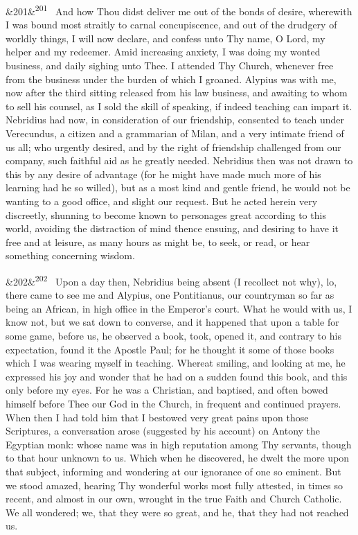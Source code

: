 \documentclass[12pt]{article}
\newcommand{\para}[1][]{\par\noindent\ifx&#1&\else\textsuperscript{\footnotesize #1}~\fi}
\begin{document}
\para[201] And how Thou didst deliver me out of the bonds of desire, wherewith I was bound most straitly to carnal concupiscence, and out of the drudgery of worldly things, I will now declare, and confess unto Thy name, O Lord, my helper and my redeemer. Amid increasing anxiety, I was doing my wonted business, and daily sighing unto Thee. I attended Thy Church, whenever free from the business under the burden of which I groaned. Alypius was with me, now after the third sitting released from his law business, and awaiting to whom to sell his counsel, as I sold the skill of speaking, if indeed teaching can impart it. Nebridius had now, in consideration of our friendship, consented to teach under Verecundus, a citizen and a grammarian of Milan, and a very intimate friend of us all; who urgently desired, and by the right of friendship challenged from our company, such faithful aid as he greatly needed. Nebridius then was not drawn to this by any desire of advantage (for he might have made much more of his learning had he so willed), but as a most kind and gentle friend, he would not be wanting to a good office, and slight our request. But he acted herein very discreetly, shunning to become known to personages great according to this world, avoiding the distraction of mind thence ensuing, and desiring to have it free and at leisure, as many hours as might be, to seek, or read, or hear something concerning wisdom.

\para[202] Upon a day then, Nebridius being absent (I recollect not why), lo, there came to see me and Alypius, one Pontitianus, our countryman so far as being an African, in high office in the Emperor's court. What he would with us, I know not, but we sat down to converse, and it happened that upon a table for some game, before us, he observed a book, took, opened it, and contrary to his expectation, found it the Apostle Paul; for he thought it some of those books which I was wearing myself in teaching. Whereat smiling, and looking at me, he expressed his joy and wonder that he had on a sudden found this book, and this only before my eyes. For he was a Christian, and baptised, and often bowed himself before Thee our God in the Church, in frequent and continued prayers. When then I had told him that I bestowed very great pains upon those Scriptures, a conversation arose (suggested by his account) on Antony the Egyptian monk: whose name was in high reputation among Thy servants, though to that hour unknown to us. Which when he discovered, he dwelt the more upon that subject, informing and wondering at our ignorance of one so eminent. But we stood amazed, hearing Thy wonderful works most fully attested, in times so recent, and almost in our own, wrought in the true Faith and Church Catholic. We all wondered; we, that they were so great, and he, that they had not reached us.
\end{document}
